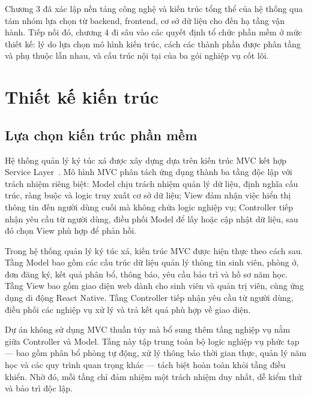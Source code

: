 \documentclass[../DoAn.tex]{subfiles}
\begin{document}
\sloppy

Chương 3 đã xác lập nền tảng công nghệ và kiến trúc tổng thể của hệ thống qua
tám nhóm lựa chọn từ backend, frontend, cơ sở dữ liệu cho đến hạ tầng vận hành.
Tiếp nối đó, chương 4 đi sâu vào các quyết định tổ chức phần mềm ở mức thiết
kế: lý do lựa chọn mô hình kiến trúc, cách các thành phần được phân tầng và
phụ thuộc lẫn nhau, và cấu trúc nội tại của ba gói nghiệp vụ cốt lõi.

\section{Thiết kế kiến trúc}
\label{sec:arch_design}

\subsection{Lựa chọn kiến trúc phần mềm}
\label{subsec:arch_choice}

Hệ thống quản lý ký túc xá được xây dựng dựa trên kiến trúc MVC kết hợp
Service Layer~\cite{fowler2002patterns}. Mô hình MVC phân tách ứng dụng thành
ba tầng độc lập với trách nhiệm riêng biệt: Model chịu trách nhiệm quản lý dữ
liệu, định nghĩa cấu trúc, ràng buộc và logic truy xuất cơ sở dữ liệu; View
đảm nhận việc hiển thị thông tin đến người dùng cuối mà không chứa logic nghiệp
vụ; Controller tiếp nhận yêu cầu từ người dùng, điều phối Model để lấy hoặc
cập nhật dữ liệu, sau đó chọn View phù hợp để phản hồi.

Trong hệ thống quản lý ký túc xá, kiến trúc MVC được hiện thực theo cách sau.
Tầng Model bao gồm các cấu trúc dữ liệu quản lý thông tin sinh viên, phòng ở,
đơn đăng ký, kết quả phân bổ, thông báo, yêu cầu bảo trì và hồ sơ năm học.
Tầng View bao gồm giao diện web dành cho sinh viên và quản trị viên, cùng
ứng dụng di động React Native. Tầng Controller tiếp nhận yêu cầu từ người
dùng, điều phối các nghiệp vụ xử lý và trả kết quả phù hợp về giao diện.

Dự án không sử dụng MVC thuần túy mà bổ sung thêm tầng nghiệp vụ nằm giữa
Controller và Model. Tầng này tập trung toàn bộ logic nghiệp vụ phức tạp ---
bao gồm phân bổ phòng tự động, xử lý thông báo thời gian thực, quản lý năm
học và các quy trình quan trọng khác --- tách biệt hoàn toàn khỏi tầng điều
khiển. Nhờ đó, mỗi tầng chỉ đảm nhiệm một trách nhiệm duy nhất, dễ kiểm thử
và bảo trì độc lập.
\end{document}
